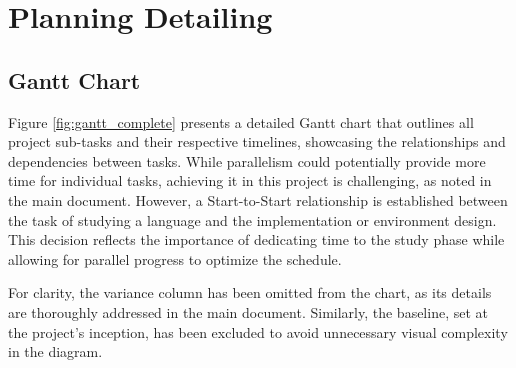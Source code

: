 
\chapter{Planning Detailing} %

\label{AppendixA} %

\section{Gantt Chart}

Figure \ref{fig:gantt_complete} presents a detailed Gantt chart that outlines all project sub-tasks and their respective timelines, showcasing the relationships and dependencies between tasks. While parallelism could potentially provide more time for individual tasks, achieving it in this project is challenging, as noted in the main document. However, a Start-to-Start relationship is established between the task of studying a language and the implementation or environment design. This decision reflects the importance of dedicating time to the study phase while allowing for parallel progress to optimize the schedule.

For clarity, the variance column has been omitted from the chart, as its details are thoroughly addressed in the main document. Similarly, the baseline, set at the project’s inception, has been excluded to avoid unnecessary visual complexity in the diagram.

